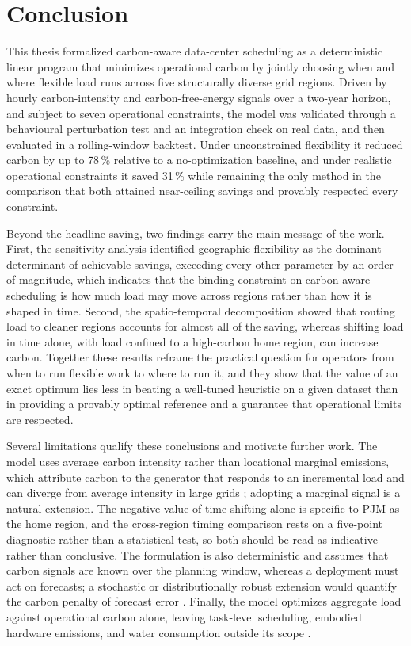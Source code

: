 \section{Conclusion}
\label{sec:conclusion}

This thesis formalized carbon-aware data-center scheduling as a deterministic linear program that minimizes operational carbon by jointly choosing when and where flexible load runs across five structurally diverse grid regions. Driven by hourly carbon-intensity and carbon-free-energy signals over a two-year horizon, and subject to seven operational constraints, the model was validated through a behavioural perturbation test and an integration check on real data, and then evaluated in a rolling-window backtest. Under unconstrained flexibility it reduced carbon by up to 78\,\% relative to a no-optimization baseline, and under realistic operational constraints it saved 31\,\% while remaining the only method in the comparison that both attained near-ceiling savings and provably respected every constraint.

Beyond the headline saving, two findings carry the main message of the work. First, the sensitivity analysis identified geographic flexibility as the dominant determinant of achievable savings, exceeding every other parameter by an order of magnitude, which indicates that the binding constraint on carbon-aware scheduling is how much load may move across regions rather than how it is shaped in time. Second, the spatio-temporal decomposition showed that routing load to cleaner regions accounts for almost all of the saving, whereas shifting load in time alone, with load confined to a high-carbon home region, can increase carbon. Together these results reframe the practical question for operators from when to run flexible work to where to run it, and they show that the value of an exact optimum lies less in beating a well-tuned heuristic on a given dataset than in providing a provably optimal reference and a guarantee that operational limits are respected.

Several limitations qualify these conclusions and motivate further work. The model uses average carbon intensity rather than locational marginal emissions, which attribute carbon to the generator that responds to an incremental load and can diverge from average intensity in large grids \citep{cote2024locational, lindberg2022geographic}; adopting a marginal signal is a natural extension. The negative value of time-shifting alone is specific to PJM as the home region, and the cross-region timing comparison rests on a five-point diagnostic rather than a statistical test, so both should be read as indicative rather than conclusive. The formulation is also deterministic and assumes that carbon signals are known over the planning window, whereas a deployment must act on forecasts; a stochastic or distributionally robust extension would quantify the carbon penalty of forecast error \citep{li2024uncertainty, hall2024probabilistic}. Finally, the model optimizes aggregate load against operational carbon alone, leaving task-level scheduling, embodied hardware emissions, and water consumption outside its scope \citep{gupta2021chasing, li2023thirsty}.

